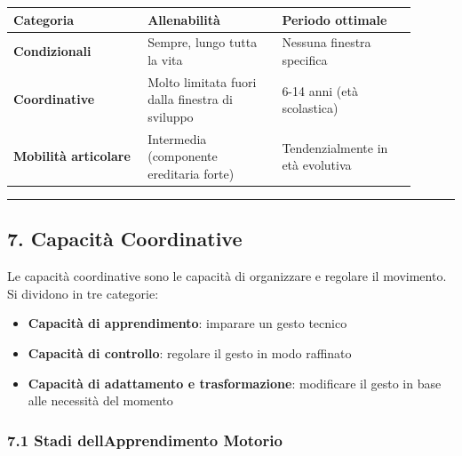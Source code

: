 \documentclass[a4paper,11pt]{article}
\providecommand{\tightlist}{%
  \setlength{\itemsep}{0pt}\setlength{\parskip}{0pt}}
\begin{document}
\begin{longtable}[]{@{}p{0.30\linewidth}p{0.30\linewidth}p{0.30\linewidth}@{}}
      \toprule\noalign{}
      Categoria                    & Allenabilità                                    & Periodo ottimale \\
      \midrule\noalign{}
      \endhead
      \bottomrule\noalign{}
      \endlastfoot
      \textbf{Condizionali}        & Sempre, lungo tutta la vita                     & Nessuna finestra
      specifica                                                                                         \\
      \textbf{Coordinative}        & Molto limitata fuori dalla finestra di sviluppo
                                   & 6-14 anni (età scolastica)                                         \\
      \textbf{Mobilità articolare} & Intermedia (componente ereditaria forte)
                                   & Tendenzialmente in età evolutiva                                   \\
\end{longtable}

\begin{center}\rule{0.5\linewidth}{0.5pt}\end{center}

\subsection{7. Capacità Coordinative}\label{capacituxe0-coordinative-1}

Le capacità coordinative sono le capacità di organizzare e regolare il
movimento. Si dividono in tre categorie:

\begin{itemize}
      \tightlist
      \item
            \textbf{Capacità di apprendimento}: imparare un gesto tecnico
      \item
            \textbf{Capacità di controllo}: regolare il gesto in modo raffinato
      \item
            \textbf{Capacità di adattamento e trasformazione}: modificare il gesto
            in base alle necessità del momento
\end{itemize}

\subsubsection{7.1 Stadi dell\textquotesingle Apprendimento
      Motorio}\label{stadi-dellapprendimento-motorio}
\end{document}
